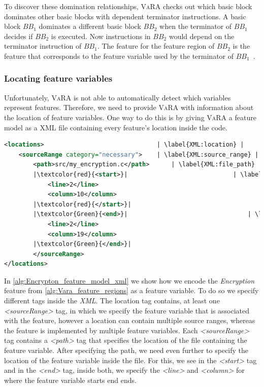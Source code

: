 To discover these domination relationships, \textsc{VaRA} checks out which basic block dominates other basic blocks with dependent terminator instructions. 
A basic block $BB_1$ dominates a different basic block $BB_2$ when the terminator of $BB_1$ decides if $BB_2$ is executed. 
Now instructions in $BB_2$ would depend on the terminator instruction of $BB_1$. 
The feature for the feature region of $BB_2$ is the feature that corresponds to the feature variable used by the terminator of $BB_1$~\cite{VaRA-Tom}.

\subsubsection{Locating feature variables}
Unfortunately, \textsc{VaRA} is not able to automatically detect which variables represent features. 
Therefore, we need to provide \textsc{VaRA} with information about the location of feature variables. One way to do this is by giving \textsc{VaRA}
a feature model as a \textsc{XML} file containing every feature's location inside the code.

\begin{minipage}{\linewidth}
\begin{lstlisting}[caption={Feature model of \autoref{alg:Vara_feature_regions} in XML. The start of a feature variable is highlighted in red and the
    end is highlighted in green.},
    language=XML,label={alg:Encrypton_feature_model_xml},escapechar=|, captionpos=b]
<locations>                               | \label{XML:location} |
    <sourceRange category="necessary">    | \label{XML:source_range} |
        <path>src/my_encryption.c</path>      | \label{XML:file_path} |
        |\textcolor{red}{<start>}|                             | \label{XML:start_variable} |
            <line>2</line>
            <column>10</column>
        |\textcolor{red}{</start>}| 
        |\textcolor{Green}{<end>}|                                 | \label{XML:end_variable} |
            <line>2</line>
            <column>19</column>
        |\textcolor{Green}{</end>}|
        </sourceRange>
</locations>
\end{lstlisting}
\end{minipage}

In \autoref{alg:Encrypton_feature_model_xml} we show how we encode the \emph{Encryption} feature from \autoref{alg:Vara_feature_regions} as a
feature variable. To do so we specify different tags inside the \emph{XML}.
The location tag contains, at least one \emph{<sourceRange>} tag, in which we specify the feature variable that is associated with the feature, 
however a location can contain multiple source ranges, whereas the feature is implemented by multiple feature variables.
Each \emph{<sourceRange>} tag contains a \emph{<path>} tag that specifies the location of the file containing the feature variable.
After specifying the path, we need even further to specify the location of the feature variable inside the file. 
For this, we see in  the \emph{<start>} tag and in  the \emph{<end>} tag, 
inside both, we specify the \emph{<line>} and \emph{<column>} for where the feature variable starts end ends. 

